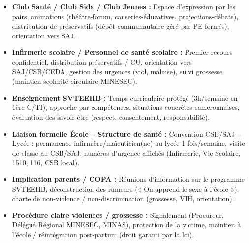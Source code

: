 \documentclass[11pt]{article}
\begin{document}
\begin{definition}
\begin{itemize}
    \item \textbf{Club Santé / Club Sida / Club Jeunes :} Espace d'expression par les pairs, animations (théâtre-forum, causeries-éducatives, projections-débats), distribution de préservatifs (dépôt communautaire géré par PE formés), orientation vers SAJ.
    \item \textbf{Infirmerie scolaire / Personnel de santé scolaire :} Premier recours confidentiel, distribution préservatifs / CU, orientation vers SAJ/CSB/CEDA, gestion des urgences (viol, malaise), suivi grossesse (maintien scolarité circulaire MINESEC).
    \item \textbf{Enseignement SVTEEHB :} Temps curriculaire protégé (3h/semaine en 1ère C/TI), approche par compétences, situations concrètes camerounaises, évaluation des savoir-être (respect, consentement, responsabilité).
    \item \textbf{Liaison formelle École -- Structure de santé :} Convention CSB/SAJ -- Lycée : permanence infirmière/maïeuticien(ne) au lycée 1 fois/semaine, visite de classe au CSB/SAJ, numéros d'urgence affichés (Infirmerie, Vie Scolaire, 1510, 116, CSB local).
    \item \textbf{Implication parents / COPA :} Réunions d'information sur le programme SVTEEHB, déconstruction des rumeurs (« On apprend le sexe à l'école »), charte de non-violence / non-discrimination (grossesse, VIH, orientation).
    \item \textbf{Procédure claire violences / grossesse :} Signalement (Procureur, Délégué Régional MINESEC, MINAS), protection de la victime, maintien à l'école / réintégration post-partum (droit garanti par la loi).
\end{itemize}
\end{definition}
\end{document}
